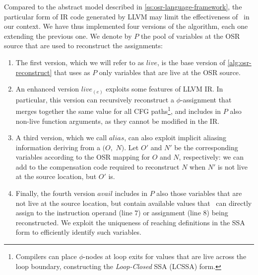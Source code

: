 Compared to the abstract model described in \mysection\ref{ss:osr-language-framework}, the particular form of IR code generated by LLVM may limit the effectiveness of \reconstruct\ in our context.
We have thus implemented four versions of the algorithm, each one extending the previous one. We denote by $P$ the pool of variables at the OSR source that are used to reconstruct the assignments:
\begin{enumerate}
 \item The first version, which we will refer to as $live$, is the base version of \myalgorithm\ref{alg:osr-reconstruct} that uses as $P$ only variables that are live at the OSR source.
 \item An enhanced version $live_{(e)}$ exploits some features of LLVM IR. In particular, this version can recursively reconstruct a $\phi$-assignment that merges together the same value for all CFG paths\footnote{Compilers can place $\phi$-nodes at loop exits for values that are live across the loop boundary, constructing the {\em Loop-Closed} SSA (LCSSA) form.}, and includes in $P$ also non-live function arguments, as they cannot be modified in the IR.
 \item A third version, which we call $alias$, can also exploit implicit aliasing information deriving from a \RAUW$(O,$ $N)$. Let $O'$ and $N'$ be the corresponding variables according to the OSR mapping for $O$ and $N$, respectively: we can add  to the compensation code required to reconstruct $N$ when $N'$ is not live at the source location, but $O'$ is.
 \item Finally, the fourth version $avail$ includes in $P$ also those variables that are not live at the source location, but contain available values that \reconstruct\ can directly assign to the instruction operand (line $7$) or assignment (line $8$) being reconstructed. We exploit the uniqueness of reaching definitions in the SSA form to efficiently identify such variables.
\end{enumerate}